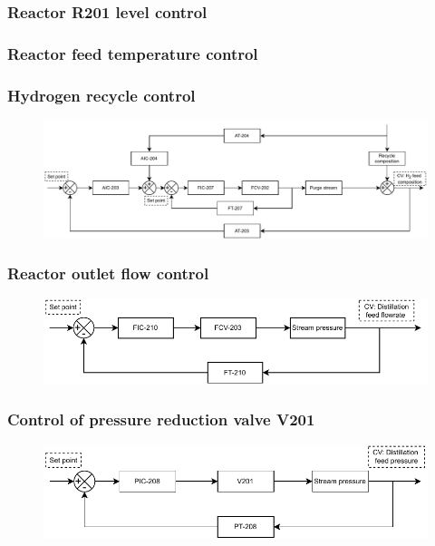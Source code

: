 \subsubsection{Reactor R201 level control}

\subsubsection{Reactor feed temperature control}

\subsubsection{Hydrogen recycle control}
\begin{figure}[H]
    \centering
    \includegraphics[width=\linewidth]{chapters/4-operation-control/4-Figures/V202-CC.pdf}
    \caption{}
    \label{fig:V202-CC}
\end{figure}

\subsubsection{Reactor outlet flow control}
\begin{figure}[H]
    \centering
    \includegraphics[width=\linewidth]{chapters/4-operation-control/4-Figures/V201-FC.pdf}
    \caption{}
    \label{fig:V201-FC}
\end{figure}


\subsubsection{Control of pressure reduction valve V201}
\begin{figure}[H]
    \centering
    \includegraphics[width=\linewidth]{chapters/4-operation-control/4-Figures/V201-PC.pdf}
    \caption{}
    \label{fig:V201-PC}
\end{figure}

